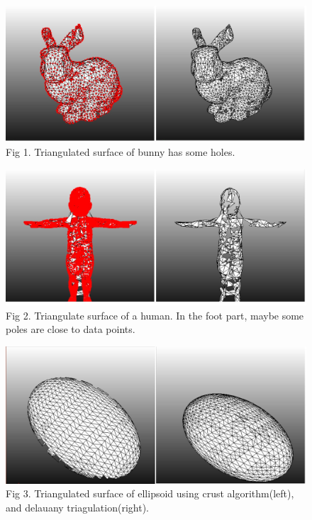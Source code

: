 \documentclass[11pt]{article}
\begin{document}
\begin{figure}[h]
  \includegraphics[width=120mm]{crust_bunny.jpg}\\
  Fig 1. Triangulated surface of bunny has some holes.
\end{figure}

\begin{figure}[h]
  \includegraphics[width=120mm]{crust_bb.jpg}\\
  Fig 2. Triangulate surface of a human. In the foot part, maybe some poles are close to data points. 
\end{figure}


\begin{figure}[h]
  \includegraphics[width=120mm]{crust_ellipsoid.jpg}\\
  Fig 3. Triangulated surface of ellipsoid using crust algorithm(left), and delauany triagulation(right).
\end{figure}
\end{document}
